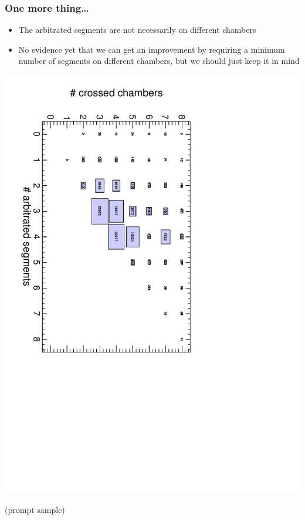 \documentclass[compress]{beamer}
\begin{document}
\begin{frame}
\frametitle{One more thing\ldots}

\begin{itemize}
\item The arbitrated segments are not necessarily on different chambers
\item No evidence yet that we can get an improvement by requiring a
  minimum number of segments on different chambers, but we should just
  keep it in mind
\end{itemize}

\begin{center}
\includegraphics[height=0.85\linewidth, angle=90]{tracks_segments_chambers.pdf}
\end{center}

\vspace{-3 cm}
\hfill (prompt sample) \mbox{\hspace{1.5 cm}}

\vspace{3 cm}
\end{frame}
\end{document}
